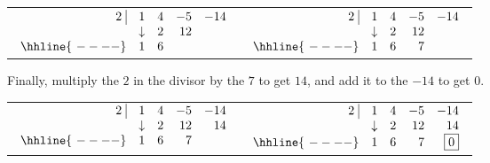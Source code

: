 \begin{center}

\begin{tabular}{cc}


$ \begin{array}{rrrrr}


  2 \, \, \vline& 1 & 4 & -5  & -14 \\

   & \downarrow &  2  &  12  &  \\ \hhline{~----} 
  & 1  &   6  &   &    \\  
\end{array}$ \hspace{1in}

&

$ \begin{array}{rrrrr}


  2 \, \, \vline& 1 & 4 & -5  & -14 \\

   & \downarrow &  2  &  12  &  \\ \hhline{~----} 
  & 1  &   6  & 7  &    \\  
\end{array}$ \\


\end{tabular}

\end{center}


Finally, multiply the $2$ in the divisor by the $7$ to get $14$, and add it to the $-14$ to get $0$.

\bigskip

\begin{center}

\begin{tabular}{cc}

$ \begin{array}{rrrrr}


  2 \, \, \vline& 1 & 4 & -5  & -14 \\

   & \downarrow &  2  &  12  & 14 \\ \hhline{~----} 
  & 1  &   6  & 7  &    \\  
\end{array}$ \hspace{1in} 

&

$ \begin{array}{rrrrr}


  2 \, \, \vline& 1 & 4 & -5  & -14 \\

   & \downarrow &  2  &  12  & 14 \\ \hhline{~----} 
  & 1  &   6  & 7  &  \fbox{$0$}  \\  
\end{array}$ \\



\end{tabular}

\end{center}

